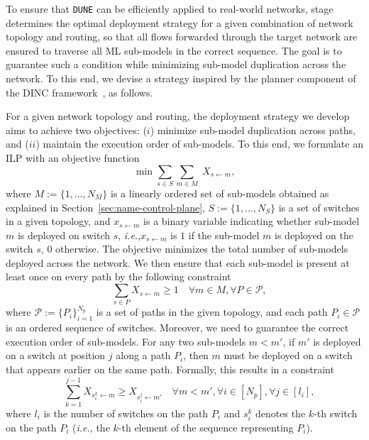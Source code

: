 \documentclass[journal]{IEEEtran}
\theoremstyle{plain} %
\newcommand{\ie}{\textit{i.e.},\xspace}
\newcommand*\numO[1]{\raisebox{.5pt}{\textcircled{\raisebox{-.9pt} {#1}}}}
\newcommand{\name}{\texttt{\fontsize{9}{11}\selectfont DUNE}\xspace}
\begin{document}
To ensure that \name can be efficiently applied to real-world networks, stage \numO{6} determines the optimal deployment strategy for a given combination of network topology and routing, so that all flows forwarded through the target network are ensured to traverse all ML sub-models in the correct sequence. The goal is to guarantee such a condition while minimizing sub-model duplication across the network.
To this end, we devise a strategy inspired by the planner component of the DINC framework~\cite{dinc-conext23}, as follows.

For a given network topology and routing, the deployment strategy we develop aims to achieve two objectives: ($i$) minimize sub-model duplication across paths, and ($ii$) maintain the execution order of sub-models. To this end, we formulate an ILP with an objective function
\begin{equation}
\min \sum_{s\in S} \sum_{m\in M} \; X_{s \gets m},
\label{eq:dpl-str-objective}
\end{equation}
where $M := \{1, \dots, N_M\}$ is a linearly ordered set of sub-models obtained as explained in Section~\ref{sec:name-control-plane}, $S := \{1, \dots, N_S\}$ is a set of switches in a given topology, and $x_{s \leftarrow m}$ is a binary variable indicating whether sub-model $m$ is deployed on switch $s$, \ie $x_{s \leftarrow m}$ is $1$ if the sub-model $m$ is deployed on the switch $s$, $0$ otherwise. The objective minimizes the total number of sub-models deployed across the network. We then ensure that each sub-model is present at least once on every path by the following constraint
\begin{equation}
\quad \sum_{s \in P} X_{s \gets m} \geq 1
            \quad \forall m \in M, \forall P \in \mathcal{P},
\label{eq:model-coverage-constraint}
\end{equation}
where $\mathcal{P} := \{P_i\}_{i=1}^{N_p}$ is a set of paths in the given topology, and each path $P_i \in \mathcal{P}$ is an ordered sequence of switches.
Moreover, we need to guarantee the correct execution order of sub-models. For any two sub-models $m < m'$, if $m'$ is deployed on a switch at position $j$ along a path $P_i$, then $m$ must be deployed on a switch that appears earlier on the same path. Formally, this results in a constraint
\begin{equation}
 \quad \sum_{k=1}^{j-1} X_{s_i^k \gets m} \geq X_{s_i^j\gets m'}
            \quad \forall m < m',\forall i \in [N_p], \forall j \in [l_i],
\label{eq:dependency-constraint}
\end{equation}
where $l_i$ is the number of switches on the path $P_i$ and $s_i^k$ denotes the $k$-th switch on the path $P_i$ (\ie the $k$-th element of the sequence representing $P_i$).
\end{document}
